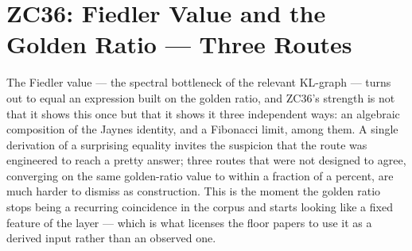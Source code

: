 \documentclass[12pt, a4paper]{article}
\begin{document}
\medskip

\section{ZC36: Fiedler Value and the Golden Ratio --- Three Routes}
\label{sec:zc36-fiedler}

The Fiedler value --- the spectral bottleneck of the relevant KL-graph --- turns
out to equal an expression built on the golden ratio, and ZC36's strength is not
that it shows this once but that it shows it three independent ways: an algebraic
composition of the Jaynes identity, and a Fibonacci limit, among them. A single
derivation of a surprising equality invites the suspicion that the route was
engineered to reach a pretty answer; three routes that were not designed to
agree, converging on the same golden-ratio value to within a fraction of a
percent, are much harder to dismiss as construction. This is the moment the
golden ratio stops being a recurring coincidence in the corpus and starts looking
like a fixed feature of the layer --- which is what licenses the floor papers to
use it as a derived input rather than an observed one.



\sloppy

\end{document}

